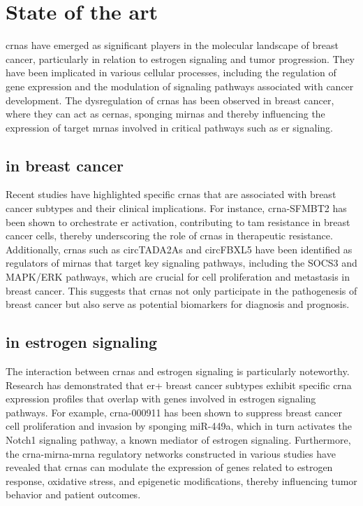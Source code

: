 \section{State of the art}
\Glspl{crna} have emerged as significant players in the
molecular landscape of breast cancer, particularly in relation to estrogen
signaling and tumor progression.
They have been implicated in various cellular processes, including the
regulation of gene expression and the modulation of signaling pathways
associated with cancer
development\supercite{li_circrna-sfmbt2_2023,tran_new_2020}.
The dysregulation of \glspl{crna} has been observed in breast cancer, where
they can act as \glspl{cerna}, sponging \glspl{mirna} and thereby influencing
the expression of target \glspl{mrna} involved in critical pathways such as
\gls{er} signaling\supercite{nair_circular_2016,xu_circrna_2022}.

\subsection{ in breast cancer}
Recent studies have highlighted specific \glspl{crna} that are associated with
breast cancer subtypes and their clinical implications.
For instance, \gls{crna}-SFMBT2 has been shown to orchestrate
\gls{er}\textalpha{} activation, contributing to \gls{tam} resistance in breast
cancer cells, thereby underscoring the role of \glspl{crna} in therapeutic
resistance\supercite{li_circrna-sfmbt2_2023}.
Additionally, \glspl{crna} such as circTADA2As and circFBXL5 have been
identified as regulators of \glspl{mirna} that target key signaling pathways,
including the SOCS3 and MAPK/ERK pathways, which are crucial for cell
proliferation and metastasis in breast
cancer\supercite{xu_circtada2as_2019,gao_hsa_circrna_0006528_2019}.
This suggests that \glspl{crna} not only participate in the pathogenesis of
breast cancer but also serve as potential biomarkers for diagnosis and
prognosis\supercite{liu_influence_2021,chen_circepsti1_2018}.

\subsection{ in estrogen signaling}
The interaction between \glspl{crna} and estrogen signaling is particularly
noteworthy.
Research has demonstrated that \gls{er+} breast cancer subtypes exhibit
specific \gls{crna} expression profiles that overlap with genes involved in
estrogen signaling pathways\supercite{nair_circular_2016}.
For example, \gls{crna}-000911 has been shown to suppress breast cancer cell
proliferation and invasion by sponging miR-449a, which in turn activates the
Notch1 signaling pathway, a known mediator of estrogen
signaling\supercite{wang_comprehensive_2018}.
Furthermore, the \gls{crna}-\gls{mirna}-\gls{mrna} regulatory networks
constructed in various studies have revealed that \glspl{crna} can modulate the
expression of genes related to estrogen response, oxidative stress, and
epigenetic modifications, thereby influencing tumor behavior and patient
outcomes\supercite{xu_circrna_2022,nair_circular_2016}.
